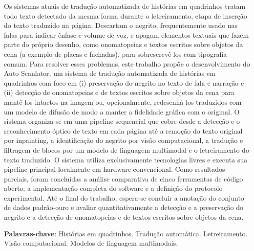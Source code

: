 \documentclass[
    12pt,
    openright,
    oneside,
    a4paper,
    chapter=TITLE,
    section=TITLE,
    english,
    brazilian,
    brazil
]{abntex2}
\begin{document}
\setlength{\absparsep}{18pt}

\begin{resumo}[Resumo]
\SingleSpacing
Os sistemas atuais de tradução automatizada de histórias em quadrinhos tratam todo texto detectado da mesma forma durante o letreiramento, etapa de inserção do texto traduzido na página. Descartam o negrito, frequentemente usado nas falas para indicar ênfase e volume de voz, e apagam elementos textuais que fazem parte do próprio desenho, como onomatopeias e textos escritos sobre objetos da cena (a exemplo de placas e fachadas), para sobrescrevê-los com tipografia comum. Para resolver esses problemas, este trabalho propõe o desenvolvimento do Auto Scanlator, um sistema de tradução automatizada de histórias em quadrinhos com foco em (i) preservação do negrito no texto de fala e narração e (ii) detecção de onomatopeias e de textos escritos sobre objetos da cena para mantê-los intactos na imagem ou, opcionalmente, redesenhá-los traduzidos com um modelo de difusão de modo a manter a fidelidade gráfica com o original. O sistema organiza-se em uma pipeline sequencial que cobre desde a detecção e o reconhecimento óptico de texto em cada página até a remoção do texto original por inpainting, a identificação do negrito por visão computacional, a tradução e filtragem de blocos por um modelo de linguagem multimodal e o letreiramento do texto traduzido. O sistema utiliza exclusivamente tecnologias livres e executa sua pipeline principal localmente em hardware convencional. Como resultados parciais, foram concluídas a análise comparativa de cinco ferramentas de código aberto, a implementação completa do software e a definição do protocolo experimental. Até o final do trabalho, espera-se concluir a anotação do conjunto de dados padrão-ouro e avaliar quantitativamente a detecção e a preservação do negrito e a detecção de onomatopeias e de textos escritos sobre objetos da cena.

\textbf{Palavras-chave}: Histórias em quadrinhos. Tradução automática. Letreiramento. Visão computacional. Modelos de linguagem multimodais.
\end{resumo}

\cleardoublepage
\end{document}
